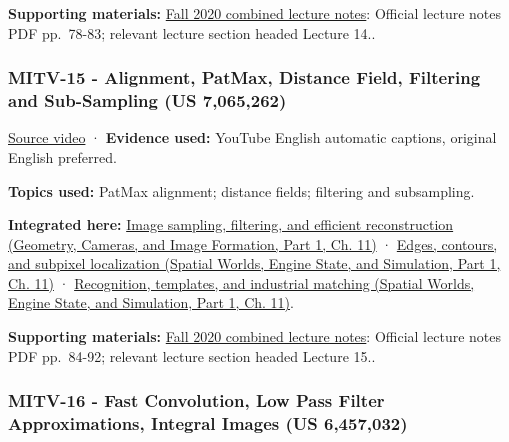 \textbf{Supporting materials:} \href{https://ocw.mit.edu/courses/6-801-machine-vision-fall-2020/9ec44f69e72995c370b3797818ba01e6_MIT6_801F20_lectureNotes.pdf}{Fall 2020 combined lecture notes}: Official lecture notes PDF pp.~78-83; relevant lecture section headed Lecture 14..

\subsubsection{MITV-15 - Alignment, PatMax, Distance Field, Filtering and Sub-Sampling (US 7,065,262)}\label{04-visual-computing-ii-ch036-mitv-15---alignment-patmax-distance-field-filtering-and-sub-sampling-us-7065262}

\hypertarget{04-visual-computing-ii-ch036-mitv-15---alignment-patmax-distance-field-filtering-and-sub-sampling-us-7065262}{}

\href{https://www.youtube.com/watch?v=R1yLwFOfwwc}{Source video} · \textbf{Evidence used:} YouTube English automatic captions, original English preferred.

\textbf{Topics used:} PatMax alignment; distance fields; filtering and subsampling.

\textbf{Integrated here:} \href{../03-Geometry-Cameras-and-Image-Formation-P01/main.pdf\#03-visual-computing-i-ch004-image-sampling-filtering-and-efficient-reconstruction}{Image sampling, filtering, and efficient reconstruction (Geometry, Cameras, and Image Formation, Part 1, Ch. 11)} · \href{../05-Spatial-Worlds-Engine-State-and-Simulation-P01/main.pdf\#04-visual-computing-ii-ch030-edges-contours-and-subpixel-localization}{Edges, contours, and subpixel localization (Spatial Worlds, Engine State, and Simulation, Part 1, Ch. 11)} · \href{../05-Spatial-Worlds-Engine-State-and-Simulation-P01/main.pdf\#04-visual-computing-ii-ch030-recognition-templates-and-industrial-matching}{Recognition, templates, and industrial matching (Spatial Worlds, Engine State, and Simulation, Part 1, Ch. 11)}.

\textbf{Supporting materials:} \href{https://ocw.mit.edu/courses/6-801-machine-vision-fall-2020/9ec44f69e72995c370b3797818ba01e6_MIT6_801F20_lectureNotes.pdf}{Fall 2020 combined lecture notes}: Official lecture notes PDF pp.~84-92; relevant lecture section headed Lecture 15..

\subsubsection{MITV-16 - Fast Convolution, Low Pass Filter Approximations, Integral Images (US 6,457,032)}\label{04-visual-computing-ii-ch036-mitv-16---fast-convolution-low-pass-filter-approximations-integral-images-us-6457032}

